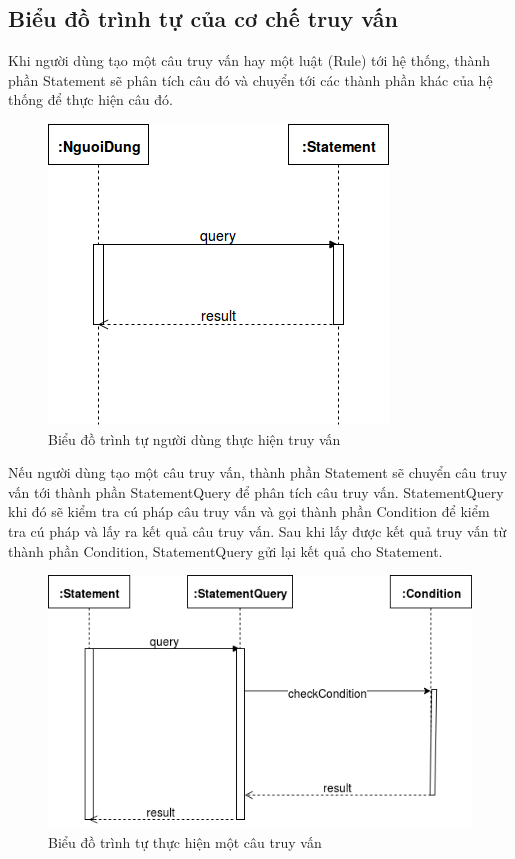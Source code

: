 \subsection{Biểu đồ trình tự của cơ chế truy vấn}

Khi người dùng tạo một câu truy vấn hay một luật (Rule) tới hệ thống, thành phần Statement sẽ phân tích câu đó và chuyển tới các thành phần khác của hệ thống để thực hiện câu đó.

\begin{figure}[h!]
	\center
	\includegraphics[scale=0.4]{image/language_diagram-statement}	
	\caption{Biểu đồ trình tự người dùng thực hiện truy vấn}
\end{figure}

Nếu người dùng tạo một câu truy vấn, thành phần Statement sẽ chuyển câu truy vấn tới thành phần StatementQuery để phân tích câu truy vấn. StatementQuery khi đó sẽ kiểm tra cú pháp câu truy vấn và gọi thành phần Condition để kiểm tra cú pháp và lấy ra kết quả câu truy vấn. Sau khi lấy được kết quả truy vấn từ thành phần Condition, StatementQuery gửi lại kết quả cho Statement.

\begin{figure}[h!]
	\center
	\includegraphics[scale=0.4]{image/language_diagram-statement_query}	
	\caption{Biểu đồ trình tự thực hiện một câu truy vấn}
\end{figure}


